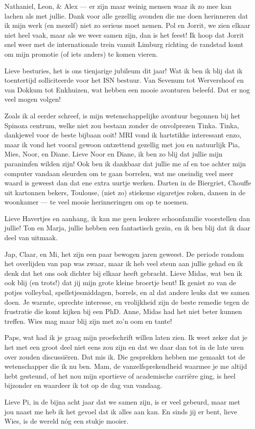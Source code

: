\documentclass[12pt,american,a4paper,oneside,]{memoir} %
\def\defstyle{Ruled} %
\begin{document}
Nathaniel, Leon, \& Alex --- er zijn maar weinig mensen waar ik zo mee kan lachen als met jullie. Dank voor alle gezellig avonden die me doen herinneren dat ik mijn werk (en mezelf) niet zo serieus moet nemen. Pol en Jorrit, we zien elkaar niet heel vaak, maar als we weer samen zijn, dan is het feest! Ik hoop dat Jorrit snel weer met de internationale trein vanuit Limburg richting de randstad komt om mijn promotie (of iets anders) te komen vieren.

Lieve besturies, het is ons tienjarige jubileum dit jaar! Wat ik ben ik blij dat ik toentertijd solliciteerde voor het ISN bestuur. Van Sevenum tot Wervershoof en van Dokkum tot Enkhuizen, wat hebben een mooie avonturen beleefd. Dat er nog veel mogen volgen!

Zoals ik al eerder schreef, is mijn wetenschappelijke avontuur begonnen bij het Spinoza centrum, welke niet zou bestaan zonder de onvolprezen Tinka. Tinka, dankjewel voor de beste bijbaan ooit! MRI vond ik hartstikke interessant enzo, maar ik vond het vooral gewoon ontzettend gezellig met jou en natuurlijk Pia, Mies, Noor, en Diane. Lieve Noor en Diane, ik ben zo blij dat jullie mijn paranimfen wilden zijn! Ook ben ik dankbaar dat jullie me af en toe achter mijn computer vandaan sleurden om te gaan borrelen, wat me oneindig veel meer waard is geweest dan dat ene extra uurtje werken. Darten in de Biergriet, Chouffe uit kartonnen bekers, Toulouse, (niet zo) stiekeme sigaretjes roken, dansen in de woonkamer --- te veel mooie herinneringen om op te noemen.

Lieve Havertjes en aanhang, ik kan me geen leukere schoonfamilie voorstellen dan jullie! Ton en Marja, jullie hebben een fantastisch gezin, en ik ben blij dat ik daar deel van uitmaak.

Jap, Claar, en Mi, het zijn een paar bewogen jaren geweest. De periode rondom het overlijden van pap was zwaar, maar ik heb veel steun aan jullie gehad en ik denk dat het ons ook dichter bij elkaar heeft gebracht. Lieve Midas, wat ben ik ook blij (en trots!) dat jij mijn grote kleine broertje bent! Ik geniet zo van de potjes volleybal, spelletjesmiddagen, borrels, en al dat andere leuks dat we samen doen. Je warmte, oprechte interesse, en vrolijkheid zijn de beste remedie tegen de frustratie die komt kijken bij een PhD. Anne, Midas had het niet beter kunnen treffen. Wies mag maar blij zijn met zo'n oom en tante!

Paps, wat had ik je graag mijn proefschrift willen laten zien. Ik weet zeker dat je het met een groot deel niet eens zou zijn en dat we daar dan tot in de late uren over zouden discussiëren. Dat mis ik. Die gesprekken hebben me gemaakt tot de wetenschapper die ik nu ben. Mam, de vanzelfsprekendheid waarmee je me altijd hebt gesteund, of het nou mijn sportieve of academische carrière ging, is heel bijzonder en waardeer ik tot op de dag van vandaag.

Lieve Pi, in de bijna acht jaar dat we samen zijn, is er veel gebeurd, maar met jou naast me heb ik het gevoel dat ik alles aan kan. En sinds jij er bent, lieve Wies, is de wereld nóg een stukje mooier.

\pagestyle{\defstyle}
\backmatter
\end{document}
